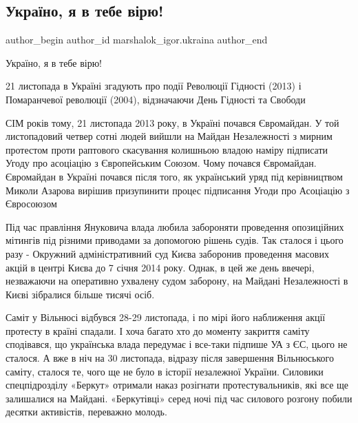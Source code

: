 
 
 
 
 
 
\subsection{Україно, я в тебе вірю!}
\label{sec:21_11_2021.fb.marshalok_igor.ukraina.1.ukraino_ja_v_tebe_virju}
 
\ifcmt
 author_begin
   author_id marshalok_igor.ukraina
 author_end
\fi

Україно, я в тебе вірю!

21 листопада в Україні згадують про події Революції Гідності (2013) і
Помаранчевої революції (2004), відзначаючи День Гідності та Свободи

СІМ років тому, 21 листопада 2013 року, в Україні почався Євромайдан. У той
листопадовий четвер сотні людей вийшли на Майдан Незалежності з мирним
протестом проти раптового скасування колишньою владою наміру підписати Угоду
про асоціацію з Європейським Союзом. Чому почався Євромайдан. Євромайдан в
Україні почався після того, як український уряд під керівництвом Миколи
Азарова вирішив призупинити процес підписання Угоди про Асоціацію з Євросоюзом 


Під час правління Януковича влада любила забороняти проведення опозиційних
мітингів під різними приводами за допомогою рішень судів. Так сталося і цього
разу - Окружний адміністративний суд Києва заборонив проведення масових акцій
в центрі Києва до 7 січня 2014 року. Однак, в цей же день ввечері, незважаючи
на оперативно ухвалену судом заборону, на Майдані Незалежності в Києві
зібралися більше тисячі осіб.  

Саміт у Вільнюсі відбувся 28-29 листопада, і по мірі його наближення акції
протесту в країні спадали. І хоча багато хто до моменту закриття саміту
сподівався, що українська влада передумає і все-таки підпише УА з ЄС, цього не
сталося. А вже в ніч на 30 листопада, відразу після завершення Вільнюського
саміту, сталося те, чого ще не було в історії незалежної України. Силовики
спецпідрозділу «Беркут» отримали наказ розігнати протестувальників, які все ще
залишалися на Майдані. «Беркутівці» серед ночі під час силового розгону побили
десятки активістів, переважно молодь.

